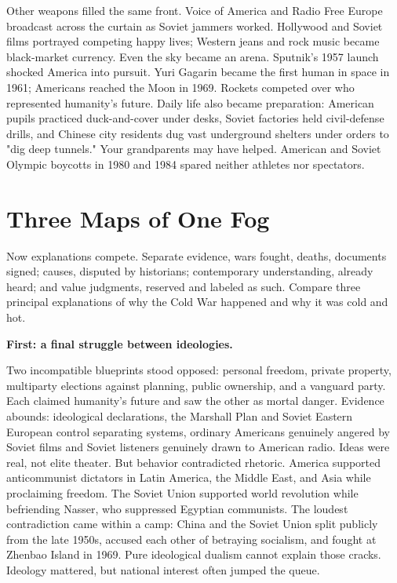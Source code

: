 Other weapons filled the same front. Voice of America and Radio Free Europe broadcast across the curtain as Soviet jammers worked. Hollywood and Soviet films portrayed competing happy lives; Western jeans and rock music became black-market currency. Even the sky became an arena. Sputnik's 1957 launch shocked America into pursuit. Yuri Gagarin became the first human in space in 1961; Americans reached the Moon in 1969. Rockets competed over who represented humanity's future. Daily life also became preparation: American pupils practiced duck-and-cover under desks, Soviet factories held civil-defense drills, and Chinese city residents dug vast underground shelters under orders to "dig deep tunnels." Your grandparents may have helped. American and Soviet Olympic boycotts in 1980 and 1984 spared neither athletes nor spectators.

\section{Three Maps of One Fog}
Now explanations compete. Separate evidence, wars fought, deaths, documents signed; causes, disputed by historians; contemporary understanding, already heard; and value judgments, reserved and labeled as such. Compare three principal explanations of why the Cold War happened and why it was cold and hot.

\textbf{First: a final struggle between ideologies.}

Two incompatible blueprints stood opposed: personal freedom, private property, multiparty elections against planning, public ownership, and a vanguard party. Each claimed humanity's future and saw the other as mortal danger. Evidence abounds: ideological declarations, the Marshall Plan and Soviet Eastern European control separating systems, ordinary Americans genuinely angered by Soviet films and Soviet listeners genuinely drawn to American radio. Ideas were real, not elite theater. But behavior contradicted rhetoric. America supported anticommunist dictators in Latin America, the Middle East, and Asia while proclaiming freedom. The Soviet Union supported world revolution while befriending Nasser, who suppressed Egyptian communists. The loudest contradiction came within a camp: China and the Soviet Union split publicly from the late 1950s, accused each other of betraying socialism, and fought at Zhenbao Island in 1969. Pure ideological dualism cannot explain those cracks. Ideology mattered, but national interest often jumped the queue.


